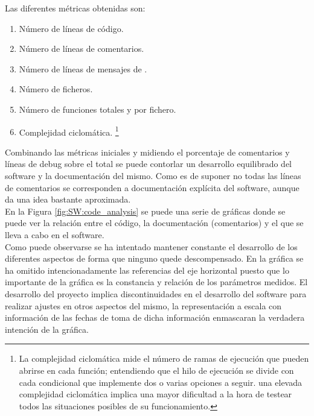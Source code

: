     Las diferentes métricas obtenidas son:

    \begin{enumerate}
        \item Número de líneas de código.
        \item Número de líneas de comentarios.
        \item Número de líneas de mensajes de .
        \item Número de ficheros.
        \item Número de funciones totales y por fichero.
        \item Complejidad ciclomática. \footnote{La complejidad ciclomática mide el número de ramas de ejecución que pueden abrirse en cada función; entendiendo que el hilo de ejecución se divide con cada condicional que implemente dos o varias opciones a seguir. una elevada complejidad ciclomática implica una mayor dificultad a la hora de testear todos las situaciones posibles de su funcionamiento.}
    \end{enumerate}

    Combinando las métricas iniciales y midiendo el porcentaje de comentarios y líneas de debug sobre el total se puede contorlar un desarrollo equilibrado del software y la documentación del mismo. Como es de suponer no todas las líneas de comentarios se corresponden a documentación explícita del software, aunque da una idea bastante aproximada. 
    \\
    
    En la Figura \ref{fig:SW:code_analysis} se puede una serie de gráficas donde se puede ver la relación entre el código, la documentación (comentarios) y el  que se lleva a cabo en el software.
    \\
    
    Como puede observarse se ha intentado mantener constante el desarrollo de los diferentes aspectos de forma que ninguno quede descompensado. En la gráfica se ha omitido intencionadamente las referencias del eje horizontal puesto que lo importante de la gráfica es la constancia y relación de los parámetros medidos. El desarrollo del proyecto implica discontinuidades en el desarrollo del software para realizar ajustes en otros aspectos del mismo, la representación a escala con información de las fechas de toma de dicha información enmascaran la verdadera intención de la gráfica.

